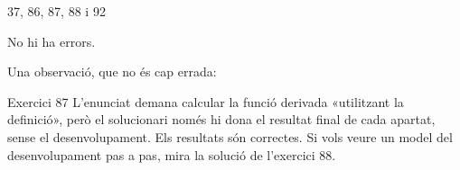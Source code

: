 
%
        {37, 86, 87, 88 i 92}

\noindent
No hi ha errors.


\ifobs
\bigskip
\noindent
Una observació, que no és cap errada:

\begin{observacio}{Exercici 87}
  L'enunciat demana calcular la funció derivada «utilitzant la definició»,
  però el solucionari només hi dona el resultat final de cada apartat, sense
  el desenvolupament. Els resultats són correctes. Si vols veure un model del
  desenvolupament pas a pas, mira la solució de l'exercici 88.
\end{observacio}
\fi

